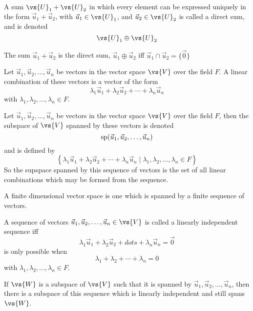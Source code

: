 \begin{definition}
  A sum $\vs{U}_1 + \vs{U}_2$ in which every element can be expressed uniquely in the form $\vec{u}_1 + \vec{u}_2$, with $\vec{u}_1 \in \vs{U}_1$, and $\vec{u}_2 \in \vs{U}_2$ is called a direct sum, and is denoted
\[ \vs{U}_1 \oplus \vs{U}_2 \]
\end{definition}
\begin{lemma}
  The sum $\vec{u}_1 + \vec{u}_2$ is the direct sum, $\vec{u}_1 \oplus \vec{u}_2$ iff $\vec{u}_1 \cap \vec{u}_2 = \{\vec{0}\}$
\end{lemma}
\begin{definition}
  Let $\vec{u}_1, \vec{u}_2, \dots, \vec{u}_n$ be vectors in the vector space $\vs{V}$ over the field $F$. A linear combination of these vectors is a vector of the form
\[ \lambda_1 \vec{u}_1 + \lambda_2 \vec{u}_2 + \cdots + \lambda_n \vec{u}_n \]
with $\lambda_1, \lambda_2, \dots, \lambda_n \in F$.
\end{definition}
\begin{definition}
   Let $\vec{u}_1, \vec{u}_2, \dots, \vec{u}_n$ be vectors in the vector space $\vs{V}$ over the field $F$,
then the subspace of $\vs{V}$ spanned by these vectors is denoted 
\[ {\rm sp}(\vec{u}_1, \vec{u}_2, \dots, \vec{u}_n) \]
and is defined by
\[ \left\{ \lambda_1 \vec{u}_1 + \lambda_2 \vec{u}_2 + \cdots +
  \lambda_n \vec{u}_n \mid \lambda_1, \lambda_2, \dots, \lambda_n \in
  F \right\} \] So the supspace spanned by this sequence of vectors is
the set of all linear combinations which may be formed from the
sequence.
\end{definition}
\begin{definition}
  A finite dimensional vector space is one which is spanned by a
  finite sequence of vectors.
\end{definition}
\begin{definition}
  A sequence of vectors $\vec{u}_1, \vec{u}_2, \dots, \vec{u}_n \in
  \vs{V}$ is called a linearly independent sequence iff
  \[ \lambda_1 \vec{u}_1 + \lambda_2 \vec{u}_2 + dots + \lambda_n
  \vec{u}_n = \vec{0}\] is only possible when
  \[ \lambda_1 + \lambda_2 + \cdots +\lambda_n = 0 \] with $\lambda_1,
  \lambda_2, \dots , \lambda_n \in F$.
\end{definition}
\begin{theorem}
  If $\vs{W}$ is a subspace of $\vs{V}$ such that it is spanned by
  $\vec{u}_1, \vec{u}_2, \dots, \vec{u}_n$, then there is a subspace
  of this sequence which is linearly independent and still spans
  $\vs{W}$.
\end{theorem}
